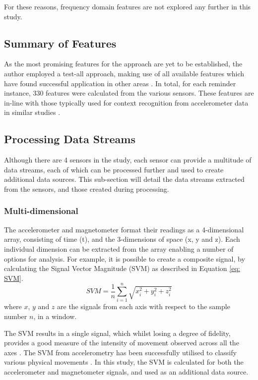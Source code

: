 For these reasons, frequency domain features are not explored any further in this study.

\subsection{Summary of Features}
As the most promising features for the approach are yet to be established, the author employed a test-all approach, making use of all available features which have found successful application in other areas \cite{Figo2010}. In total, for each reminder instance, 330 features were calculated from the various sensors. These features are in-line with those typically used for context recognition from accelerometer data in similar studies \cite{Figo2010}.

\subsection{Processing Data Streams}
Although there are 4 sensors in the study, each sensor can provide a multitude of data streams, each of which can be processed further and used to create additional data sources. This sub-section will detail the data streams extracted from the sensors, and those created during processing.

\subsubsection{Multi-dimensional}
The accelerometer and magnetometer format their readings as a 4-dimensional array, consisting of time (t), and the 3-dimensions of space (x, y and z). Each individual dimension can be extracted from the array enabling a number of options for analysis. For example, it is possible to create a composite signal, by calculating the Signal Vector Magnitude (SVM) as described in Equation \ref{eq: SVM}.
\begin{equation}
SVM =\frac{1}{n} \sum_{i=1}^n \sqrt{x_i^2 + y_i^2 + z_i^2 }
\label{eq: SVM}
\end{equation}
where $x$, $y$ and $z$ are the signals from each axis with respect to the sample number $n$, in a window.

The SVM results in a single signal, which whilst losing a degree of fidelity, provides a good measure of the intensity of movement observed across all the axes \cite{Karantonis2006}. The SVM from accelerometry has been successfully utilised to classify various physical movements \cite{Gu2011,Banos2012,Pande2013}. In this study, the SVM is calculated for both the accelerometer and magnetometer signals, and used as an additional data source.



